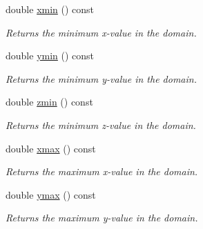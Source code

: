 \begin{DoxyCompactItemize}
\mbox{\label{classStemMesh3D_1_1mesh__3Dv_a3d36f7cff6f6006ab50287eb7ecfffe8}} 
double \hyperlink{classStemMesh3D_1_1mesh__3Dv_a3d36f7cff6f6006ab50287eb7ecfffe8}{xmin} () const
\begin{DoxyCompactList}\small\item\em Returns the minimum x-\/value in the domain. \end{DoxyCompactList}\item 
\mbox{\label{classStemMesh3D_1_1mesh__3Dv_aa3db572deb15fb732eee5c36ebf4a3ac}} 
double \hyperlink{classStemMesh3D_1_1mesh__3Dv_aa3db572deb15fb732eee5c36ebf4a3ac}{ymin} () const
\begin{DoxyCompactList}\small\item\em Returns the minimum y-\/value in the domain. \end{DoxyCompactList}\item 
\mbox{\label{classStemMesh3D_1_1mesh__3Dv_a8a9c427682879aa08eff74e9a311af88}} 
double \hyperlink{classStemMesh3D_1_1mesh__3Dv_a8a9c427682879aa08eff74e9a311af88}{zmin} () const
\begin{DoxyCompactList}\small\item\em Returns the minimum z-\/value in the domain. \end{DoxyCompactList}\item 
\mbox{\label{classStemMesh3D_1_1mesh__3Dv_a742de5662e4e8f9acb3db49e30464b2d}} 
double \hyperlink{classStemMesh3D_1_1mesh__3Dv_a742de5662e4e8f9acb3db49e30464b2d}{xmax} () const
\begin{DoxyCompactList}\small\item\em Returns the maximum x-\/value in the domain. \end{DoxyCompactList}\item 
\mbox{\label{classStemMesh3D_1_1mesh__3Dv_aabed6131430e047c4f38f3db6fbafaf1}} 
double \hyperlink{classStemMesh3D_1_1mesh__3Dv_aabed6131430e047c4f38f3db6fbafaf1}{ymax} () const
\begin{DoxyCompactList}\small\item\em Returns the maximum y-\/value in the domain. \end{DoxyCompactList}\item 

\end{DoxyCompactItemize}
